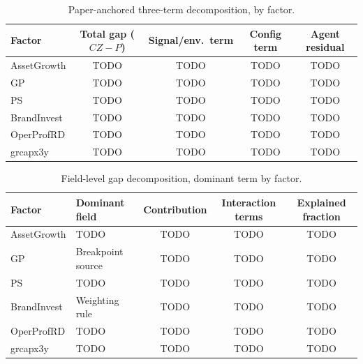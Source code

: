 \begin{table}[htbp]
  \centering
  \caption{Paper-anchored three-term decomposition, by factor.}
  \label{tab:three-term}
  \begin{tabular}{lcccc}
    \toprule
    Factor & Total gap ($CZ-P$) & Signal/env.\ term & Config term & Agent residual \\
    \midrule
    AssetGrowth & TODO & TODO & TODO & TODO \\
    GP          & TODO & TODO & TODO & TODO \\
    PS          & TODO & TODO & TODO & TODO \\
    BrandInvest & TODO & TODO & TODO & TODO \\
    OperProfRD  & TODO & TODO & TODO & TODO \\
    grcapx3y    & TODO & TODO & TODO & TODO \\
    \bottomrule
  \end{tabular}
\end{table}

\begin{table}[htbp]
  \centering
  \caption{Field-level gap decomposition, dominant term by factor.}
  \label{tab:gap-decomposition}
  \begin{tabular}{llccc}
    \toprule
    Factor & Dominant field & Contribution & Interaction terms & Explained fraction \\
    \midrule
    AssetGrowth & TODO & TODO & TODO & TODO \\
    GP          & Breakpoint source & TODO & TODO & TODO \\
    PS          & TODO & TODO & TODO & TODO \\
    BrandInvest & Weighting rule & TODO & TODO & TODO \\
    OperProfRD  & TODO & TODO & TODO & TODO \\
    grcapx3y    & TODO & TODO & TODO & TODO \\
    \bottomrule
  \end{tabular}
\end{table}
